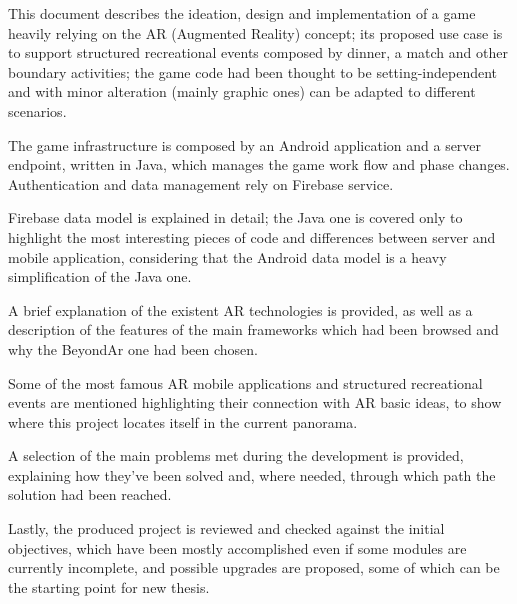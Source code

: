 \sommario
	
	This document describes the ideation, design and implementation of a game heavily relying on the AR (Augmented Reality) concept; its proposed use case is to support structured recreational events composed by dinner, a match and other boundary activities; the game code had been thought to be setting-independent and with minor alteration (mainly graphic ones) can be adapted to different scenarios.
	
	The game infrastructure is composed by an Android application and a server endpoint, written in Java, which manages the game work flow and phase changes.
	Authentication and data management rely on Firebase service.
	
	Firebase data model is explained in detail; the Java one is covered only to highlight the most interesting pieces of code and differences between server and mobile application, considering that the Android data model is a heavy simplification of the Java one.
	
	A brief explanation of the existent AR technologies is provided, as well as a description of the features of the main frameworks which had been browsed and why the BeyondAr one had been chosen.
	
	Some of the most famous AR mobile applications and structured recreational events are mentioned highlighting their connection with AR basic ideas, to show where this project locates itself in the current panorama.
	
	A selection of the main problems met during the development is provided, explaining how they've been solved and, where needed, through which path the solution had been reached.
	
	Lastly, the produced project is reviewed and checked against the initial objectives, which have been mostly accomplished even if some modules are currently incomplete, and possible upgrades are proposed, some of which can be the starting point for new thesis.